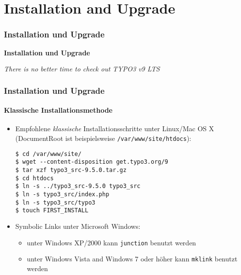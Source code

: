 %

\section{Installation and Upgrade}
\begin{frame}[fragile]
	\frametitle{Installation und Upgrade}

	\begin{center}\huge{\color{typo3darkgrey}\textbf{Installation und Upgrade}}\end{center}
	\begin{center}\large{\textit{There is no better time to check out TYPO3 v9 LTS}}\end{center}

\end{frame}


\begin{frame}[fragile]
	\frametitle{Installation und Upgrade}
	\framesubtitle{Klassische Installationsmethode}

	\begin{itemize}
		\item Empfohlene \textit{klassische} Installationsschritte unter Linux/Mac OS X\newline
			(DocumentRoot ist beispielsweise \texttt{/var/www/site/htdocs}):
\begin{lstlisting}
$ cd /var/www/site/
$ wget --content-disposition get.typo3.org/9
$ tar xzf typo3_src-9.5.0.tar.gz
$ cd htdocs
$ ln -s ../typo3_src-9.5.0 typo3_src
$ ln -s typo3_src/index.php
$ ln -s typo3_src/typo3
$ touch FIRST_INSTALL
\end{lstlisting}

		\item Symbolic Links unter Microsoft Windows:

			\begin{itemize}
				\item unter Windows XP/2000 kann \texttt{junction} benutzt werden
				\item unter Windows Vista and Windows 7 oder höher kann \texttt{mklink} benutzt werden
			\end{itemize}

	\end{itemize}
\end{frame}

